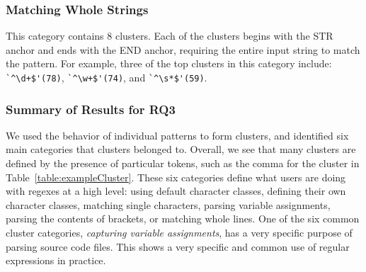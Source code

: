 \subsubsection{ Matching Whole Strings}
This category contains 8 clusters. Each of the clusters begins with the STR anchor and ends with the END anchor, requiring the entire input string to match the pattern. For example, three of the top clusters in this category include:
\verb!`^\d+$'(78)!, \verb!`^\w+$'(74)!, and \verb!`^\s*$'(59)!.



\subsubsection{Summary of Results for RQ3}
\label{sec:clusterResults}
We used the behavior of individual patterns to form clusters, and identified six main categories that clusters belonged to.  Overall, we see that many clusters are defined by the presence of particular tokens, such as the comma for the cluster in Table~\ref{table:exampleCluster}.
These six categories define what users are doing with regexes at a high level: using default character classes, defining their own character classes, matching single characters, parsing variable assignments, parsing the contents of brackets, or matching whole lines.
 One of the six common cluster categories, \emph{capturing variable assignments}, has a very specific purpose of parsing source code files. This shows a very specific and common use of regular expressions in practice.






